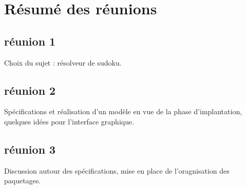 \section{Résumé des réunions}

\subsection{réunion 1}
Choix du sujet : résolveur de sudoku.

\subsection{réunion 2}
Spécifications et réalisation d'un modèle 
en vue de la phase d'implantation, 
quelques idées pour l'interface graphique.

\subsection{réunion 3}
Discussion autour des spécifications, 
mise en place de l'oragnisation des paquetages.